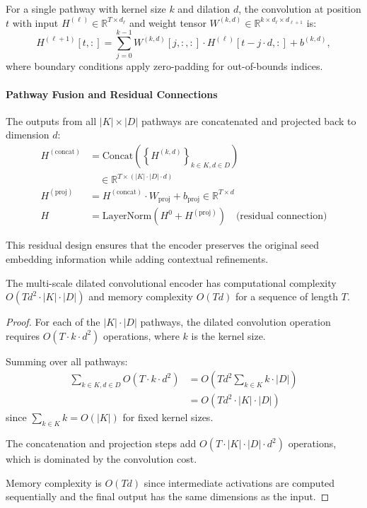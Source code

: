 For a single pathway with kernel size \(k\) and dilation \(d\), the convolution at position \(t\) with input \(H^{(\ell)} \in \mathbb{R}^{T \times d_{\ell}}\) and weight tensor \(W^{(k,d)} \in \mathbb{R}^{k \times d_{\ell} \times d_{\ell+1}}\) is:
\begin{equation}
H^{(\ell+1)}[t, :] = \sum_{j=0}^{k-1} W^{(k,d)}[j, :, :] \cdot H^{(\ell)}[t - j \cdot d, :] + b^{(k,d)},
\label{eq:dilated-conv}
\end{equation}
where boundary conditions apply zero-padding for out-of-bounds indices.

\paragraph{Pathway Fusion and Residual Connections}

The outputs from all \(|K| \times |D|\) pathways are concatenated and projected back to dimension \(d\):
\begin{align}
H^{(\text{concat})} &= \text{Concat}\left(\left\{H^{(k,d)}\right\}_{k \in K, d \in D}\right) \nonumber \\
&\quad \in \mathbb{R}^{T \times (|K| \cdot |D| \cdot d)} \\
H^{(\text{proj})} &= H^{(\text{concat})} \cdot W_{\text{proj}} + b_{\text{proj}} \in \mathbb{R}^{T \times d} \\
H &= \text{LayerNorm}(H^0 + H^{(\text{proj})}) \quad \text{(residual connection)}
\label{eq:pathway-fusion}
\end{align}

This residual design ensures that the encoder preserves the original seed embedding information while adding contextual refinements.

\begin{proposition}
	The multi-scale dilated convolutional encoder has computational complexity \(O(T d^2 \cdot |K| \cdot |D|)\) and memory complexity \(O(T d)\) for a sequence of length \(T\).
\end{proposition}

\begin{proof}
	For each of the \(|K| \cdot |D|\) pathways, the dilated convolution operation requires \(O(T \cdot k \cdot d^2)\) operations, where \(k\) is the kernel size. 
	
	Summing over all pathways:
	\begin{align}
	\sum_{k \in K, d \in D} O(T \cdot k \cdot d^2) &= O\left(T d^2 \sum_{k \in K} k \cdot |D|\right) \nonumber \\
	&= O(T d^2 \cdot |K| \cdot |D|)
	\label{eq:conv-complexity}
	\end{align}
	since \(\sum_{k \in K} k = O(|K|)\) for fixed kernel sizes.
	
	The concatenation and projection steps add \(O(T \cdot |K| \cdot |D| \cdot d^2)\) operations, which is dominated by the convolution cost.
	
	Memory complexity is \(O(T d)\) since intermediate activations are computed sequentially and the final output has the same dimensions as the input.
\end{proof}

